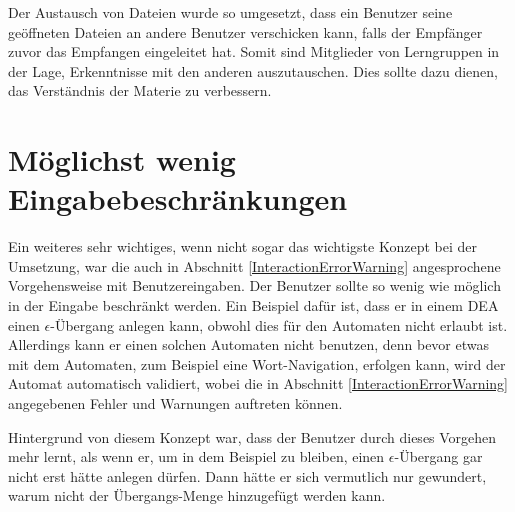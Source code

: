 Der Austausch von Dateien wurde so umgesetzt, dass ein Benutzer seine
geöffneten Dateien an andere Benutzer verschicken kann, falls der Empfänger
zuvor das Empfangen eingeleitet hat. Somit sind Mitglieder von Lerngruppen in
der Lage, Erkenntnisse mit den anderen auszutauschen. Dies sollte dazu dienen,
das Verständnis der Materie zu verbessern.\vspace{10pt}


\section{Möglichst wenig Eingabebeschränkungen}\label{ConceptsInput}

Ein weiteres sehr wichtiges, wenn nicht sogar das wichtigste Konzept bei der
Umsetzung, war die auch in Abschnitt \ref{InteractionErrorWarning} angesprochene
Vorgehensweise mit Benutzereingaben. Der Benutzer sollte so wenig wie möglich
in der Eingabe beschränkt werden. Ein Beispiel dafür ist, dass er in einem DEA
einen $\epsilon$-Übergang anlegen kann, obwohl dies für den Automaten nicht
erlaubt ist. Allerdings kann er einen solchen Automaten nicht benutzen, denn
bevor etwas mit dem Automaten, zum Beispiel eine Wort-Navigation, erfolgen kann,
wird der Automat automatisch validiert, wobei die in Abschnitt
\ref{InteractionErrorWarning} angegebenen Fehler und Warnungen auftreten
können.\vspace{10pt}

Hintergrund von diesem Konzept war, dass der Benutzer durch dieses Vorgehen mehr
lernt, als wenn er, um in dem Beispiel zu bleiben, einen $\epsilon$-Übergang gar
nicht erst hätte anlegen dürfen. Dann hätte er sich vermutlich nur gewundert,
warum \Symbol{$\epsilon$} nicht der Übergangs-Menge hinzugefügt werden
kann.\vspace{10pt}
